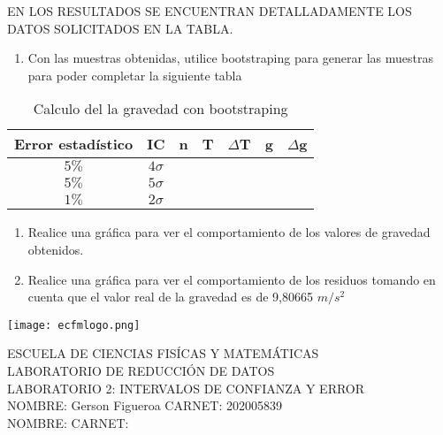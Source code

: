 \documentclass[
]{article}
\providecommand{\tightlist}{%
  \setlength{\itemsep}{0pt}\setlength{\parskip}{0pt}}
\begin{document}
EN LOS RESULTADOS SE ENCUENTRAN DETALLADAMENTE LOS DATOS SOLICITADOS EN
LA TABLA.

\begin{enumerate}
\def\labelenumi{\arabic{enumi}.}
\setcounter{enumi}{7}
\tightlist
\item
  Con las muestras obtenidas, utilice bootstraping para generar las
  muestras para poder completar la siguiente tabla
\end{enumerate}

\begin{table}[ht]
\centering
\caption{Calculo del la gravedad con bootstraping}
\begin{tabular}{ccccccc}
Error estadístico & IC & n & T & $\Delta$T & g & $\Delta$g \\  \hline
$5\%$ & $4 \sigma$ & \\
$5\%$ & $5 \sigma$ & \\
$1\%$ & $2 \sigma$ & \\
\hline
\end{tabular}
\end{table}

\begin{enumerate}
\def\labelenumi{\arabic{enumi}.}
\setcounter{enumi}{8}
\tightlist
\item
  Realice una gráfica para ver el comportamiento de los valores de
  gravedad obtenidos.
\item
  Realice una gráfica para ver el comportamiento de los residuos tomando
  en cuenta que el valor real de la gravedad es de 9,80665 \(m/s^2\)
\end{enumerate}

\newpage

\begin{flushleft}
\texttt{[image: ecfmlogo.png]}
\end{flushleft}
\vspace{-2.7cm}
\hspace{2.5cm} 
\parbox{12cm}{ ESCUELA DE CIENCIAS FISÍCAS Y MATEMÁTICAS\\LABORATORIO DE REDUCCIÓN DE DATOS\\LABORATORIO 2: INTERVALOS DE CONFIANZA Y ERROR\\NOMBRE: Gerson Figueroa \hspace{0.6cm} CARNET: 202005839 \\NOMBRE:  \hspace{0.6cm} CARNET:\\ \hspace{0.6cm} } 
\end{document}

